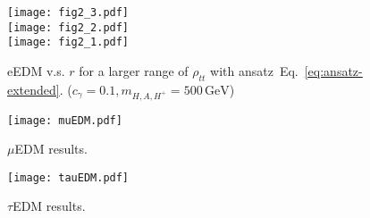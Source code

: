 \begin{figure}[p]
    \centering
    \texttt{[image: fig2\_3.pdf]}\\
    \texttt{[image: fig2\_2.pdf]}\\
    \texttt{[image: fig2\_1.pdf]}
    \caption{eEDM v.s. \(r \) for a larger range of \(\rho_{tt} \) with ansatz~Eq.~\eqref{eq:ansatz-extended}. (\(c_{\gamma} = 0.1, m_{H, A, H^+} = 500\,\mathrm{GeV} \))}
    \label{fig:eEDM}
\end{figure}

\begin{figure}[p]
    \centering
    \texttt{[image: muEDM.pdf]}
    \caption{\(\mu \)EDM results.}
    \label{fig:muEDM}
\end{figure}

\begin{figure}[p]
    \centering
    \texttt{[image: tauEDM.pdf]}
    \caption{\(\tau \)EDM results.}
    \label{fig:tauEDM}
\end{figure}